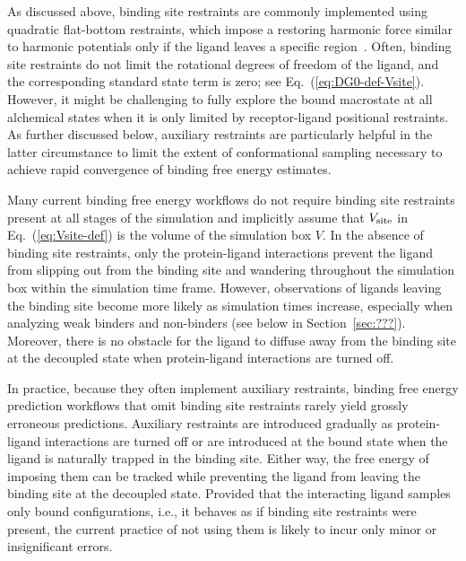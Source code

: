 \documentclass[9pt,bestpractices]{livecoms}
\begin{document}
As discussed above, binding site restraints are commonly implemented using quadratic flat-bottom restraints, which impose a restoring harmonic force similar to harmonic potentials only if the ligand leaves a specific region~\cite{chen2007can}. Often, binding site restraints do not limit the rotational degrees of freedom of the ligand, and the corresponding standard state term is zero; see Eq.~(\ref{eq:DG0-def-Vsite}). However, it might be challenging to fully explore the bound macrostate at all alchemical states when it is only limited by receptor-ligand positional restraints. As further discussed below, auxiliary restraints are particularly helpful in the latter circumstance to limit the extent of conformational sampling necessary to achieve rapid convergence of binding free energy estimates.

Many current binding free energy workflows do not require binding site restraints present at all stages of the simulation and implicitly assume that $V_{\rm site}$ in Eq.~(\ref{eq:Vsite-def}) is the volume of the simulation box $V$. In the absence of binding site restraints, only the protein-ligand interactions prevent the ligand from slipping out from the binding site and wandering throughout the simulation box within the simulation time frame. However, observations of ligands leaving the binding site become more likely as simulation times increase, especially when analyzing weak binders and non-binders (see below in Section~\ref{sec:???}). Moreover, there is no obstacle for the ligand to diffuse away from the binding site at the decoupled state when protein-ligand interactions are turned off.

In practice, because they often implement auxiliary restraints, binding free energy prediction workflows that omit binding site restraints rarely yield grossly erroneous predictions. Auxiliary restraints are introduced gradually as protein-ligand interactions are turned off or are introduced at the bound state when the ligand is naturally trapped in the binding site. Either way, the free energy of imposing them can be tracked while preventing the ligand from leaving the binding site at the decoupled state. Provided that the interacting ligand samples only bound configurations, i.e., it behaves as if binding site restraints were present, the current practice of not using them is likely to incur only minor or insignificant errors. 
\end{document}
